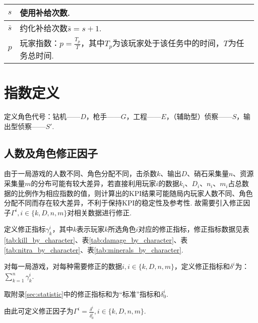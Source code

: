 \documentclass{ctexart}
\begin{document}
\begin{longtable}{|>{\centering\arraybackslash}p{3em}|>{\centering\arraybackslash}p{30em}|}
    \hline

    $s$        & 使用补给次数.                                                                                                            \\

    \hline

    $\bar{s}$  & 约化补给次数$\bar{s} =s + 1$.                                                                                            \\

    \hline

    $p$        & 玩家指数：$p = \frac{T_{p}}{T}$，其中$T_{p}$为该玩家处于该任务中的时间，$T$为任务总时间.                                                       \\

    \hline
\end{longtable}



\section{指数定义}

定义角色代号：钻机——$D$，枪手——$G$，工程——$E$，（辅助型）侦察——$S$，输出型侦察——$S'$.

\subsection{人数及角色修正因子}

由于一局游戏的人数不同、角色分配不同，击杀数$k$、输出$D$、硝石采集量$n$、资源采集量$m$的分布可能有较大差异，若直接利用玩家$i$的数据$k_i$、$D_i$、$n_i$、$m_i$占总数据的比例作为相应指数的值，则计算出的KPI结果可能随局内玩家人数不同、角色分配不同而存在较大差异，不利于保持KPI的稳定性及参考性.
故需要引入修正因子$\Gamma^i, i \in \{k, D, n, m\}$对相关数据进行修正.

定义修正指标$\gamma_k^i$，其中$k$表示玩家$k$所选角色$i$对应的修正指标，修正指标数据见表\ref{tab:kill_by_character}、表\ref{tab:damage_by_character}、表\ref{tab:nitra_by_character}、表\ref{tab:minerals_by_character}.

对每一局游戏，对每种需要修正的数据$i, i \in \{k, D, n, m\}$，定义修正指标和$\delta^i$为：$\sum_{k = 1}^{n} \gamma_k^i$.

取附录\ref{sec:statistic}中的修正指标和为“标准”指标和$\delta_0^i$.

由此可定义修正因子为$\Gamma^i = \frac{\delta^i}{\delta_0^i}, i \in \{k, D, n, m\}$.
\end{document}
